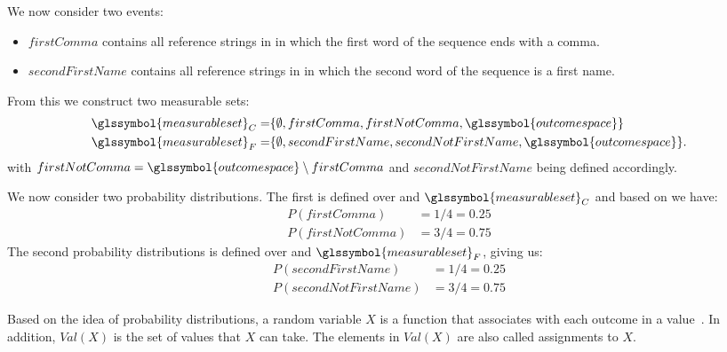 We now consider two events:
\begin{itemize}
  \item $firstComma$ contains all reference strings in  in which the first word of the sequence ends with a comma.
  \item $secondFirstName$ contains all reference strings in  in which the second word of the sequence is a first name.
\end{itemize}

From this we construct two \glspl{measurable set}:
\begin{equation*}
    \begin{split}
  \glssymbol{measurable set}_{C}=& \{\emptyset,firstComma, firstNotComma, \glssymbol{outcome space}\}\\
  \glssymbol{measurable set}_{F}=& \{\emptyset,secondFirstName, secondNotFirstName, \glssymbol{outcome space}\}.
    \end{split}
\end{equation*}
with $firstNotComma=\glssymbol{outcome space}\setminus firstComma$ and $secondNotFirstName$ being defined accordingly.

We now consider two \glspl{probability distribution}.
The first is defined over  and $\glssymbol{measurable set}_{C}$ and based on  we have:
\begin{equation*}
    \begin{split}
      P(firstComma)&=1/4=0.25\\
      P(firstNotComma)&=3/4=0.75
    \end{split}
\end{equation*}
The second \glspl{probability distribution} is defined over  and $\glssymbol{measurable set}_{F}$, giving us:
\begin{equation*}
  \label{equ:eg-measurable-sets}
    \begin{split}
      P(secondFirstName)&=1/4=0.25\\
      P(secondNotFirstName)&=3/4=0.75
    \end{split}
\end{equation*}

\bigskip

Based on the idea of \glspl{probability distribution}, a \gls{random variable} $X$ is a \gls{function} that associates with each outcome in  a value~\cite{koller2009probabilistic}.
In addition, $Val(X)$ is the set of values that $X$ can take.
The elements in $Val(X)$ are also called assignments to $X$.

